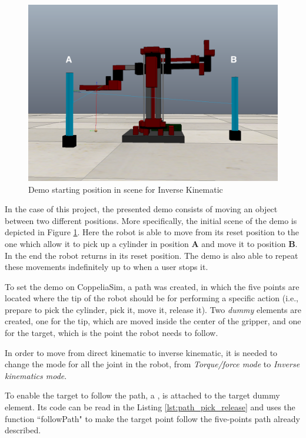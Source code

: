 \begin{figure}[h]
\begin{center}
\includegraphics[width=0.75\linewidth]{capitolo3/figure/demo_ik}
\caption{Demo starting position in scene for Inverse Kinematic}
\label{fig:demo_ik} 
\end{center}
\end{figure}

In the case of this project, the presented demo consists of moving an object between two different positions. More specifically, the initial scene of the demo is depicted in Figure \ref{fig:demo_ik}. Here the robot is able to move from its reset position to the one which allow it to pick up a cylinder in position \textbf{A} and move it to position \textbf{B}. In the end the robot returns in its reset position.
The demo is also able to repeat these movements indefinitely up to when a user stops it.

To set the demo on CoppeliaSim, a path was created, in which the five points are located where the tip of the robot should be for performing a specific action (i.e., prepare to pick the cylinder, pick it, move it, release it). Two \textit{dummy} elements are created, one for the tip, which are moved inside the center of the gripper, and one for the target, which is the point the robot needs to follow.

In order to move from direct kinematic to inverse kinematic, it is needed\cite{VrepCopp83:online} to change the mode for all the joint in the robot, from \textit{Torque/force mode} to \textit{Inverse kinematics mode}.

To enable the target to follow the path\cite{PathFoll72:online}, a , is attached to the target dummy element. Its code can be read in the Listing \ref{lst:path_pick_release} and uses the function ``followPath" to make the target point follow the five-points path already described.

